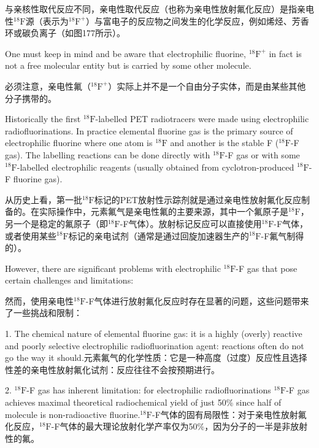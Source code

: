 \documentclass[dvipsnames, svgnames,a4paper,11pt]{article}
\begin{document}
与亲核性取代反应不同，亲电性取代反应（也称为亲电性放射氟化反应）是指亲电性${}^\mathrm{18}\mathrm{F}$源（表示为{${}^\mathrm{18}\mathrm{F}^+$}）与富电子的反应物之间发生的化学反应，例如烯烃、芳香环或碳负离子（如图177所示）。

One must keep in mind and be aware that electrophilic fluorine, {${}^\mathrm{18}\mathrm{F}^+$} in fact is not a
free molecular entity but is carried by some other molecule.

必须注意，亲电性氟（{${}^\mathrm{18}\mathrm{F}^+$}）实际上并不是一个自由分子实体，而是由某些其他分子携带的。


Historically the first ${}^\mathrm{18}\mathrm{F}$-labelled PET radiotracers were made using electrophilic
radiofluorinations. In practice elemental fluorine gas is the primary source of
electrophilic fluorine where one atom is ${}^\mathrm{18}\mathrm{F}$ and another is the stable F (${}^\mathrm{18}\mathrm{F}$-F gas).
The labelling reactions can be done directly with ${}^\mathrm{18}\mathrm{F}$-F gas or with some ${}^\mathrm{18}\mathrm{F}$-labelled
electrophilic reagents (usually obtained from cyclotron-produced ${}^\mathrm{18}\mathrm{F}$-F fluorine gas).

从历史上看，第一批${}^\mathrm{18}\mathrm{F}$标记的PET放射性示踪剂就是通过亲电性放射氟化反应制备的。在实际操作中，元素氟气是亲电性氟的主要来源，其中一个氟原子是${}^\mathrm{18}\mathrm{F}$，另一个是稳定的氟原子（即${}^\mathrm{18}\mathrm{F}$-F气体）。放射标记反应可以直接使用${}^\mathrm{18}\mathrm{F}$-F气体，或者使用某些${}^\mathrm{18}\mathrm{F}$标记的亲电试剂（通常是通过回旋加速器生产的${}^\mathrm{18}\mathrm{F}$-F氟气制得的）。

However, there are significant problems with electrophilic ${}^\mathrm{18}\mathrm{F}$-F gas that pose certain
challenges and limitations:

然而，使用亲电性${}^\mathrm{18}\mathrm{F}$-F气体进行放射氟化反应时存在显著的问题，这些问题带来了一些挑战和限制：



1. The chemical nature of elemental fluorine gas: it is a highly (overly) reactive
and poorly selective electrophilic radiofluorination agent: reactions often do
not go the way it should.元素氟气的化学性质：它是一种高度（过度）反应性且选择性差的亲电性放射氟化试剂：反应往往不会按预期进行。

2. ${}^\mathrm{18}\mathrm{F}$-F gas has inherent limitation: for electrophilic radiofluorinations ${}^\mathrm{18}\mathrm{F}$-F gas
achieves maximal theoretical radiochemical yield of just 50\% since half of
molecule is non-radioactive fluorine.${}^\mathrm{18}\mathrm{F}$-F气体的固有局限性：对于亲电性放射氟化反应，${}^\mathrm{18}\mathrm{F}$-F气体的最大理论放射化学产率仅为50\%，因为分子的一半是非放射性的氟。
\end{document}

